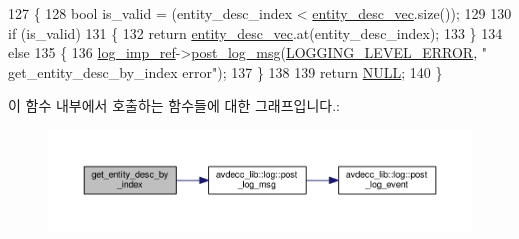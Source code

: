 \begin{DoxyCode}
127 \{
128     \textcolor{keywordtype}{bool} is\_valid = (entity\_desc\_index < \hyperlink{classavdecc__lib_1_1end__station__imp_a72edab41bc56e3c1757944a7df188a3d}{entity\_desc\_vec}.size());
129 
130     \textcolor{keywordflow}{if} (is\_valid)
131     \{
132         \textcolor{keywordflow}{return} \hyperlink{classavdecc__lib_1_1end__station__imp_a72edab41bc56e3c1757944a7df188a3d}{entity\_desc\_vec}.at(entity\_desc\_index);
133     \}
134     \textcolor{keywordflow}{else}
135     \{
136         \hyperlink{namespaceavdecc__lib_acbe3e2a96ae6524943ca532c87a28529}{log\_imp\_ref}->\hyperlink{classavdecc__lib_1_1log_a68139a6297697e4ccebf36ccfd02e44a}{post\_log\_msg}(\hyperlink{namespaceavdecc__lib_a501055c431e6872ef46f252ad13f85cdaf2c4481208273451a6f5c7bb9770ec8a}{LOGGING\_LEVEL\_ERROR}, \textcolor{stringliteral}{"
      get\_entity\_desc\_by\_index error"});
137     \}
138 
139     \textcolor{keywordflow}{return} \hyperlink{openavb__types__base__pub_8h_a070d2ce7b6bb7e5c05602aa8c308d0c4}{NULL};
140 \}
\end{DoxyCode}


이 함수 내부에서 호출하는 함수들에 대한 그래프입니다.\+:
\nopagebreak
\begin{figure}[H]
\begin{center}
\leavevmode
\includegraphics[width=350pt]{classavdecc__lib_1_1end__station__imp_a2039add3a7eb753152149e07a86ad008_cgraph}
\end{center}
\end{figure}




